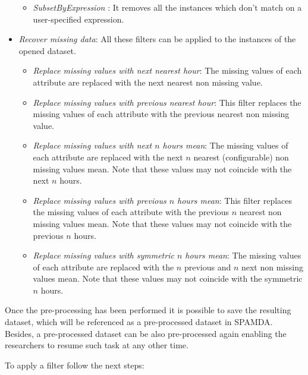 \begin{onehalfspace}
\begin{itemize}
\begin{itemize}
						\item \textit{SubsetByExpression} \cite{WEKA_Filter_SubsetByExpression}: It removes all the instances which don't match on a user-specified expression.
					\end{itemize}
				 \item \textit{Recover missing data}: All these filters can be applied to the instances of the opened dataset.
					\begin{itemize}
						\item \textit{Replace missing values with next nearest hour}: The missing values of each attribute are replaced with the next nearest non missing value.
						\item \textit{Replace missing values with previous nearest hour}: This filter replaces the missing values of each attribute with the previous nearest non missing value.
						\item \textit{Replace missing values with next $n$ hours mean}: The missing values of each attribute are replaced with the next $n$ nearest (configurable) non missing values mean. Note that these values may not coincide with the next $n$ hours.
						\item \textit{Replace missing values with previous $n$ hours mean}: This filter replaces the missing values of each attribute with the previous $n$ nearest non missing values mean. Note that these values may not coincide with the previous $n$ hours.
						\item \textit{Replace missing values with symmetric $n$ hours mean}: The missing values of each attribute are replaced with the $n$ previous and $n$ next non missing values mean. Note that these values may not coincide with the symmetric $n$ hours.
					\end{itemize}
				\end{itemize}
				
				
				Once the pre-processing has been performed it is possible to save the resulting dataset, which will be referenced as a pre-processed dataset in SPAMDA. Besides, a pre-processed dataset can be also pre-processed again enabling the researchers to resume such task at any other time.
				
				To apply a filter follow the next steps:
				

\end{onehalfspace}
